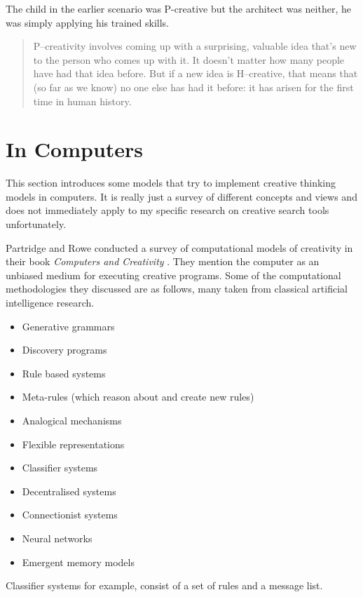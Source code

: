 The child in the earlier scenario was P-creative but the architect was neither, he was simply applying his trained skills.

\begin{quotation}
	P–creativity involves coming up with a surprising, valuable idea that's new to the person who comes up with it. It doesn't matter how many people have had that idea before. But if a new idea is H–creative, that means that (so far as we know) no one else has had it before: it has arisen for the first time in human history. 
\end{quotation}


\section{In Computers}
\label{s:compcreativity}

This section introduces some models that try to implement creative thinking models in computers. It is really just a survey of different concepts and views and does not immediately apply to my specific research on creative search tools unfortunately.

Partridge and Rowe conducted a survey of computational models of creativity in their book \textit{Computers and Creativity} \citeyear{Partridge1994}. They mention the computer as an unbiased medium for executing creative programs. Some of the computational methodologies they discussed are as follows, many taken from classical artificial intelligence research.

\begin{itemize}
  \item Generative  grammars
  \item Discovery programs
  \item Rule based systems
  \item Meta-rules (which reason about and create new rules)
  \item Analogical mechanisms
  \item Flexible representations
  \item Classifier systems
  \item Decentralised systems
  \item Connectionist systems
  \item Neural networks
  \item Emergent memory models
\end{itemize}

Classifier systems for example, consist of a set of rules and a message list.


